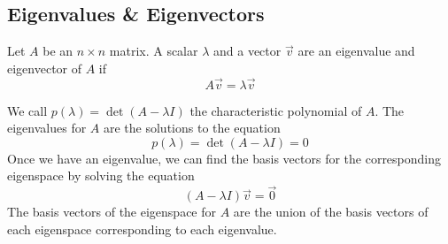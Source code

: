 \subsection{Eigenvalues \& Eigenvectors}
\begin{definition}
	Let $A$ be an $n \times n$ matrix. A scalar $\lambda$ and a vector $\vec{v}$ are an eigenvalue and eigenvector of $A$ if
	\begin{equation*}
		A\vec{v} = \lambda\vec{v}
	\end{equation*}
\end{definition}
\noindent
We call $p(\lambda) = \det{(A - \lambda I)}$ the characteristic polynomial of $A$. The eigenvalues for $A$ are the solutions to the equation
\begin{equation*}
	p(\lambda) = \det{(A - \lambda I)} = 0
\end{equation*}
Once we have an eigenvalue, we can find the basis vectors for the corresponding eigenspace by solving the equation
\begin{equation*}
	\left( A - \lambda I \right)\vec{v} = \vec{0}
\end{equation*}
The basis vectors of the eigenspace for $A$ are the union of the basis vectors of each eigenspace corresponding to each eigenvalue.

